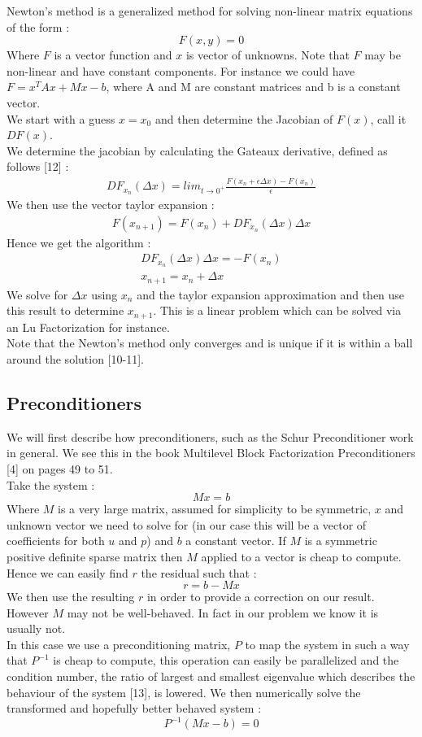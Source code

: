 \documentclass[11pt,twoside,a4paper]{article}
\begin{document}
Newton's method is a generalized method for solving non-linear matrix equations of the form :
$$
F(x,y) = 0
$$
Where $F$ is a vector function and $x$ is vector of unknowns. Note that $F$ may be non-linear and have constant components.
For instance we could have $ F = x^T A x + M x - b$, where A and M are constant matrices and b is a constant vector.\\ 
We start with a guess $x = x_0$ and then determine the Jacobian of $F(x)$, call it $DF(x)$.\\
We determine the jacobian by calculating the Gateaux derivative, defined as follows [12] :
\begin{align}
DF_{x_n}(\Delta x) = lim_{t \rightarrow 0^+} \frac{F(x_n+ \epsilon \Delta x) - F(x_n)}{\epsilon}
\end{align}
We then use the vector taylor expansion :
\begin{align*}
F(x_{n+1}) = F(x_n) + DF_{x_n}(\Delta x) \Delta x 
\end{align*}
Hence we get the algorithm :
\begin{align}
DF_{x_n}(\Delta x) \Delta x = - F(x_n)\\
x_{n+1} = x_n + \Delta x 
\end{align}
We solve for $\Delta x$ using $x_n$ and the taylor expansion approximation and then use this result to determine $x_{n+1}$.
This is a linear problem which can be solved via an Lu Factorization for instance.\\
Note that the Newton's method only converges and is unique if it is within a ball around the solution [10-11].

\subsection{Preconditioners}

We will first describe how preconditioners, such as the Schur Preconditioner work in general. We see this in the book Multilevel Block Factorization Preconditioners [4] on pages 49 to 51.\\
Take the system :\\
$$
Mx = b
$$
Where $M$ is a very large matrix, assumed for simplicity to be symmetric, $x$ and unknown vector we need to solve for (in our case this will be a vector of coefficients for both $u$ and $p$) and $b$ a constant vector. If $M$ is a symmetric positive definite sparse matrix then $M$ applied to a vector is cheap to compute. Hence we can easily find $r$ the residual such that :\\
$$
r = b - Mx
$$
We then use the resulting $r$ in order to provide a correction on our result.\\
However $M$ may not be well-behaved. In fact in our problem we know it is usually not.\\
In this case we use a preconditioning matrix, $P$ to map the system in such a way that $P^{-1}$ is cheap to compute, this operation can easily be parallelized and the condition number, the ratio of largest and smallest eigenvalue which describes the behaviour of the system [13], is lowered.
We then numerically solve the transformed and hopefully better behaved system : 
$$
P^{-1}(Mx-b) = 0
$$ 
\end{document}
